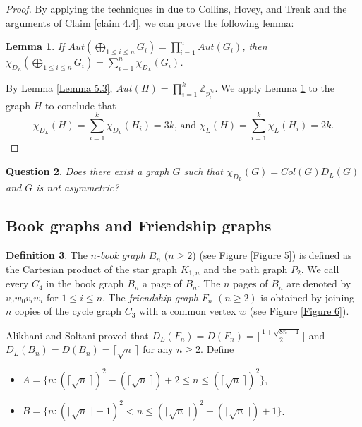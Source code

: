\documentclass[12pt,reqno,a4paper]{amsart}
\theoremstyle{definition}
\newtheorem{defn}{Definition}[section]
\newtheorem{lem}[defn]{Lemma}
\newtheorem{question}[defn]{Question}
\begin{document}
\begin{proof}
By applying the techniques in \cite[Corollary 5.5]{CHT2009} due to Collins, Hovey, and Trenk and the arguments of Claim \ref{claim 4.4}, we can prove the following lemma:

\begin{lem}\label{Lemma 5.4}
{\em If $Aut(\bigoplus_{1\leq i\leq n} G_{i}) = \prod_{i=1}^{n} Aut(G_{i})$, then $\chi_{D_{L}}(\bigoplus_{1\leq i\leq n} G_{i})=\sum_{i=1}^{n}\chi_{D_{L}}(G_{i})$. }
\end{lem}


By Lemma \ref{Lemma 5.3}, $Aut(H)=\prod_{i=1}^{k} \mathbb{Z}_{p_{i}^{n_{i}}}$. We apply Lemma \ref{Lemma 5.4} to the graph $H$ to conclude that
\[\chi_{D_{L}}(H)=\sum_{i=1}^{k} \chi_{D_{L}}(H_{i})=3k \text{, and } \chi_{L}(H)=\sum_{i=1}^{k} \chi_{L}(H_{i})=2k.\]
\end{proof}


\begin{question}
{\em Does there exist a graph $G$ 
such that $\chi_{D_{L}}(G)=Col(G)D_{L}(G)$ and $G$ is not asymmetric?} 
\end{question}


\subsection{Book graphs and Friendship graphs}

\begin{defn}\label{Definition 5.5}
The {\em $n$-book graph $B_{n}$} ($n \geq 2$) (see Figure \ref{Figure 5}) is defined as the Cartesian product of the star graph $K_{1,n}$ and the path graph $P_{2}$.
We call every $C_{4}$ in the book graph $B_{n}$ a page of $B_{n}$. The $n$ pages of $B_{n}$ are denoted by $v_{0}w_{0}v_{i}w_{i}$ for $1\leq i\leq n$. 
The {\em friendship
graph $F_{n}$}  $(n \geq 2)$ is obtained by joining $n$ copies of the cycle graph $C_{3}$ with a
common vertex $w$ (see Figure \ref{Figure 6}).
\end{defn}

Alikhani and Soltani \cite{AS, AS2017} proved that $D_{L}(F_{n})= D(F_{n})=\lceil\frac{1+\sqrt{8n+1}}{2}\rceil$ and $D_{L}(B_{n})= D(B_{n})=\lceil \sqrt{n}\,\rceil$ for any $n\geq 2$. 
Define
\begin{itemize}
    \item $A=\{n: (\lceil \sqrt{n}\,\rceil)^2-(\lceil \sqrt{n}\,\rceil) + 2 \leq n \leq (\lceil \sqrt{n}\,\rceil)^2\}$,
    \item $B= \{n: (\lceil \sqrt{n}\,\rceil-1)^2 < n \leq (\lceil \sqrt{n}\,\rceil)^2-(\lceil \sqrt{n}\,\rceil)+1\}$.
\end{itemize}
\end{document}
